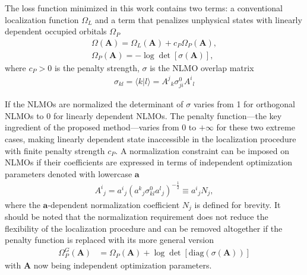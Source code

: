 \documentclass[aps,prl,reprint,amsmath,amssymb]{revtex4-1}
\newcommand{\braket}[2]{\ensuremath{\langle #1 \vert #2 \rangle}} %
\begin{document}
The loss function minimized in this work contains two terms: a conventional localization function $\Omega_L$ and a term that penalizes unphysical states with linearly dependent occupied orbitals $\Omega_P$
%
\begin{equation} \label{eq:fun-pen}
\begin{split}
\Omega(\mathbf{A}) = \Omega_L(\mathbf{A}) + c_P \Omega_P(\mathbf{A}), \\
\Omega_P(\mathbf{A}) = - \log \det \left[ \sigma (\mathbf{A}) \right],
\end{split}
\end{equation}
%
where $c_P > 0$ is the penalty strength, $\sigma$ is the NLMO overlap matrix 
%
\begin{equation}
\begin{split}
\sigma_{kl} = \braket{k}{l} = {A^j}_k \sigma_{ji}^0{A^i}_l
\end{split}
\end{equation}
%

If the NLMOs are normalized the determinant of $\sigma$ varies from 1 for orthogonal NLMOs to 0 for linearly dependent NLMOs. The penalty function---the key ingredient of the proposed method---varies from 0 to $+\infty$ for these two extreme cases, making linearly dependent state inaccessible in the localization procedure with finite penalty strength $c_P$. 
A normalization constraint can be imposed on NLMOs if their coefficients are expressed in terms of independent optimization parameters denoted with lowercase $\mathbf{a}$
%
\begin{equation}
\begin{split}
{A^i}_j = {a^i}_{j} ({a^k}_{j} \sigma^0_{kl}{a^l}_{j})^{-\frac{1}{2}} \equiv {a^i}_{j} N_j ,
\end{split}
\end{equation}
%
where the $\mathbf{a}$-dependent normalization coefficient $N_j$ is defined for brevity. 
%
It should be noted that the normalization requirement does not reduce the flexibility of the localization procedure and can be removed altogether if the penalty function is replaced with its more general version
%
\begin{equation} 
\begin{split}
\Omega_{P}^{G}(\mathbf{A}) 
 &= \Omega_{P}(\mathbf{A}) + \log \det \left[ \text{diag}(\sigma(\mathbf{A}))\right]
\end{split}
\end{equation}
%
with $\mathbf{A}$ now being independent optimization parameters.
\end{document}
